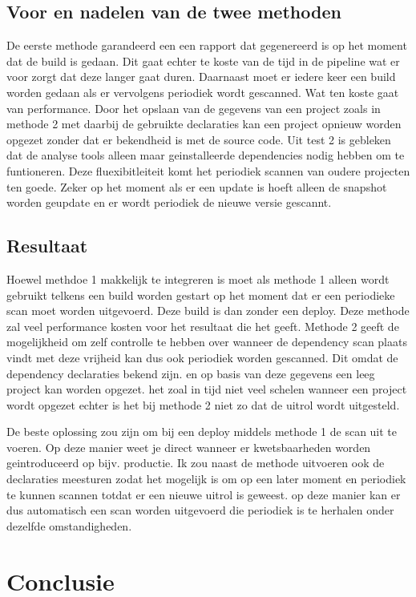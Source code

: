 \subsection{Voor en nadelen van de twee methoden}
De eerste methode garandeerd een een rapport dat gegenereerd is op het moment dat de build is gedaan. Dit gaat echter te koste van de tijd in de pipeline wat er voor zorgt dat deze langer gaat duren. Daarnaast moet er iedere keer een build worden gedaan als er vervolgens periodiek wordt gescanned. Wat ten koste gaat van performance. Door het opslaan van de gegevens van een project zoals in methode 2 met daarbij de gebruikte declaraties kan een project opnieuw worden opgezet zonder dat er bekendheid is met de source code. Uit test 2 is gebleken dat de analyse tools alleen maar geinstalleerde dependencies nodig hebben om te funtioneren. Deze fluexibitleiteit komt het periodiek scannen van oudere projecten ten goede. Zeker op het moment als er een update is hoeft alleen de snapshot worden geupdate en er wordt periodiek de nieuwe versie gescannt.
\subsection{Resultaat}
Hoewel methdoe 1 makkelijk te integreren is moet als methode 1 alleen wordt gebruikt telkens een build worden gestart op het moment dat er een periodieke scan moet worden uitgevoerd. Deze build is dan zonder een deploy. Deze methode zal veel performance kosten voor het resultaat die het geeft. Methode 2 geeft de mogelijkheid om zelf controlle te hebben over wanneer de dependency scan plaats vindt met deze vrijheid kan dus ook periodiek worden gescanned. Dit omdat de dependency declaraties bekend zijn. en op basis van deze gegevens een leeg project kan worden opgezet. het zoal in tijd niet veel schelen wanneer een project wordt opgezet echter is het bij methode 2 niet zo dat de uitrol wordt uitgesteld.

De beste oplossing zou zijn om bij een deploy middels methode 1 de scan uit te voeren. Op deze manier weet je direct wanneer er kwetsbaarheden worden geintroduceerd op bijv. productie. Ik zou naast de methode uitvoeren ook de declaraties meesturen zodat het mogelijk is om op een later moment en periodiek te kunnen scannen totdat er een nieuwe uitrol is geweest. op deze manier kan er dus automatisch een scan worden uitgevoerd die periodiek is te herhalen onder dezelfde omstandigheden.

\section{Conclusie}\label{sec:conclusie}



